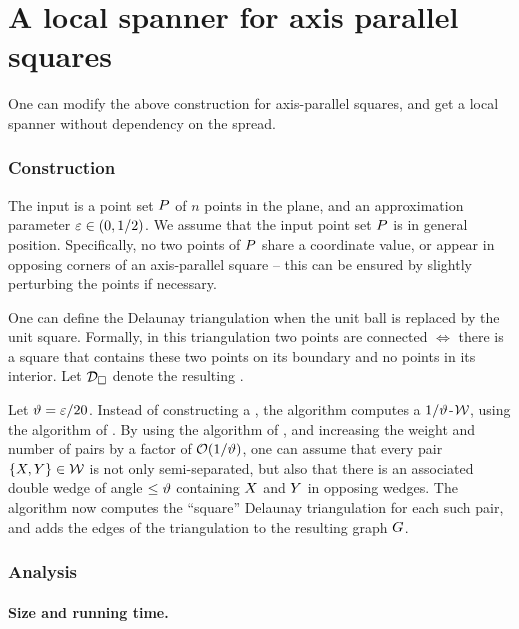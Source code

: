 \documentclass[12pt]{article}%
\begin{document}
\section{A local spanner for axis parallel squares}
One can modify the above construction for axis-parallel squares, and
get a local spanner without dependency on the spread.

\subsubsection{Construction}

The input is a point set $P$ of $n$ points in the plane, and an
approximation parameter $\varepsilon \in (0,1/2)$.  We assume that the input
point set $P$ is in general position. Specifically, no two points of
$P$ share a coordinate value, or appear in opposing corners of an
axis-parallel square -- this can be ensured by slightly perturbing the
points if necessary. %


One can define the Delaunay triangulation when the unit ball is
replaced by the unit square. Formally, in this triangulation two
points are connected $\iff$ there is a square that contains these two
points on its boundary and no points in its interior. Let
$\mathcal{D}_\square$ denote the resulting .

Let $\vartheta = \varepsilon/20$.  Instead of constructing a \WSPD, the algorithm
computes a $1/\vartheta$-\SSPD $\mathcal{W}$, using the algorithm of
. By using the algorithm of , and increasing the weight and number of pairs by a
factor of $\mathcal{O}(1/\vartheta)$,
one can assume that every pair $\{ X, Y \} \in \mathcal{W}$ is not only
semi-separated, but also that there is an associated double wedge of angle
$\leq \vartheta$ containing $X$ and $Y$ in opposing wedges.  The algorithm now computes the ``square'' Delaunay
triangulation for each such pair, and adds the edges of the
triangulation to the resulting graph $G$.



\subsubsection{Analysis}

\paragraph{Size and running time.}
\end{document}
